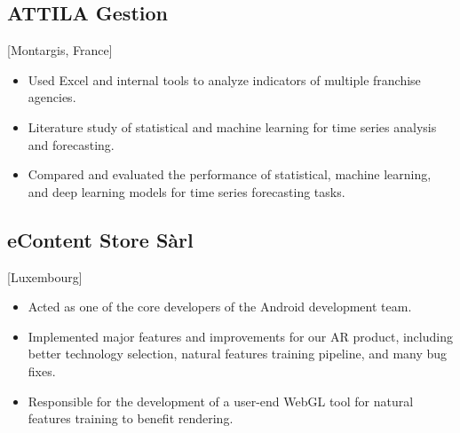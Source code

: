 \documentclass{mycv}
\begin{document}
\subsection{ATTILA Gestion}[Montargis, France]

\begin{positions}
\end{positions}

\begin{itemize}
  \item Used Excel and internal tools to analyze indicators of multiple franchise agencies.
  \item Literature study of statistical and machine learning for time series analysis and forecasting.
  \item Compared and evaluated the performance of statistical, machine learning, and deep learning models for time series forecasting tasks.
\end{itemize}



\subsection{eContent Store S\`arl}[Luxembourg]
\begin{positions}
\end{positions}

\begin{itemize}
  \item Acted as one of the core developers of the Android development team.
  \item Implemented major features and improvements for our AR product, including better technology selection, natural features training pipeline, and many bug fixes.
  \item Responsible for the development of a user-end WebGL tool for natural features training to benefit rendering.
\end{itemize}
\end{document}
